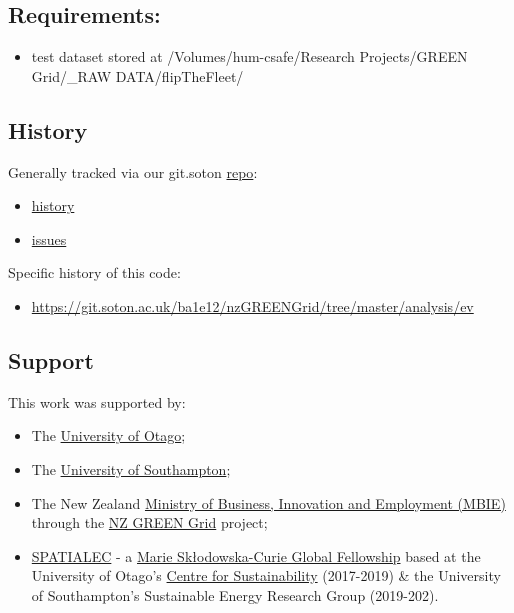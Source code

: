 \documentclass[]{article}
\providecommand{\tightlist}{%
  \setlength{\itemsep}{0pt}\setlength{\parskip}{0pt}}
\begin{document}
\subsection{Requirements:}\label{requirements}

\begin{itemize}
\tightlist
\item
  test dataset stored at /Volumes/hum-csafe/Research Projects/GREEN
  Grid/\_RAW DATA/flipTheFleet/
\end{itemize}

\subsection{History}\label{history}

Generally tracked via our git.soton
\href{https://git.soton.ac.uk/ba1e12/nzGREENGrid}{repo}:

\begin{itemize}
\tightlist
\item
  \href{https://git.soton.ac.uk/ba1e12/nzGREENGrid/commits/master}{history}
\item
  \href{https://git.soton.ac.uk/ba1e12/nzGREENGrid/issues}{issues}
\end{itemize}

Specific history of this code:

\begin{itemize}
\tightlist
\item
  \url{https://git.soton.ac.uk/ba1e12/nzGREENGrid/tree/master/analysis/ev}
\end{itemize}

\subsection{Support}\label{support}

This work was supported by:

\begin{itemize}
\tightlist
\item
  The \href{https://www.otago.ac.nz/}{University of Otago};
\item
  The \href{https://www.southampton.ac.uk/}{University of Southampton};
\item
  The New Zealand \href{http://www.mbie.govt.nz/}{Ministry of Business,
  Innovation and Employment (MBIE)} through the
  \href{https://www.otago.ac.nz/centre-sustainability/research/energy/otago050285.html}{NZ
  GREEN Grid} project;
\item
  \href{http://www.energy.soton.ac.uk/tag/spatialec/}{SPATIALEC} - a
  \href{http://ec.europa.eu/research/mariecurieactions/about-msca/actions/if/index_en.htm}{Marie
  Skłodowska-Curie Global Fellowship} based at the University of Otago's
  \href{http://www.otago.ac.nz/centre-sustainability/staff/otago673896.html}{Centre
  for Sustainability} (2017-2019) \& the University of Southampton's
  Sustainable Energy Research Group (2019-202).
\end{itemize}
\end{document}
